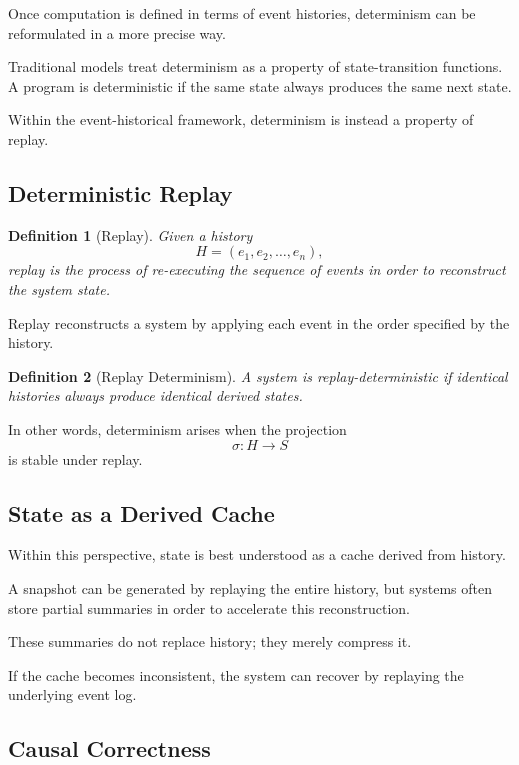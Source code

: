 \documentclass[12pt]{article}
\newtheorem{definition}{Definition}
\begin{document}
Once computation is defined in terms of event histories,
determinism can be reformulated in a more precise way.

Traditional models treat determinism as a property of
state-transition functions. A program is deterministic
if the same state always produces the same next state.

Within the event-historical framework, determinism
is instead a property of replay.

\subsection{Deterministic Replay}

\begin{definition}[Replay]
Given a history
\[
H = (e_1, e_2, \dots, e_n),
\]
replay is the process of re-executing the sequence
of events in order to reconstruct the system state.
\end{definition}

Replay reconstructs a system by applying each event
in the order specified by the history.

\begin{definition}[Replay Determinism]
A system is \emph{replay-deterministic} if identical
histories always produce identical derived states.
\end{definition}

In other words, determinism arises when the projection
\[
\sigma : H \rightarrow S
\]
is stable under replay.

\subsection{State as a Derived Cache}

Within this perspective, state is best understood as
a cache derived from history.

A snapshot can be generated by replaying the entire history,
but systems often store partial summaries in order to
accelerate this reconstruction.

These summaries do not replace history; they merely
compress it.

If the cache becomes inconsistent, the system can
recover by replaying the underlying event log.

\subsection{Causal Correctness}
\end{document}
